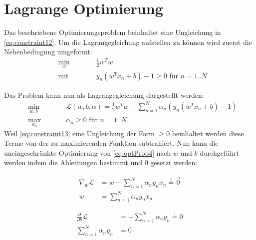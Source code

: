 \documentclass[a4paper,11pt,twoside]{scrreprt}
\newcommand{\Lagr}{\mathcal{L}}
\begin{document}
\section{Lagrange Optimierung} \label{sec:lagrange}

Das beschriebene Optimierungsproblem beinhaltet eine Ungleichung in \autoref{eq:constraint12}. Um die Lagrangegleichung aufstellen zu können wird zuerst die Nebenbedingung umgeformt:
\begin{subequations} \label{min_problem}
	\begin{alignat}{2}
		&\!\min_{w}        &\qquad&  \frac{1}{2} w^{T} w \label{eq:optProb3}\\
		&\text{mit } &      & y_n (w^{T} x_{n} + b)-1 \geq 0 \text{ für } n=1..N \label{eq:constraint13}
	\end{alignat}
\end{subequations}

Das Problem kann nun als Lagrangegleichung dargestellt werden:
\begin{subequations}
	\begin{alignat}{2}
		&\!\min_{w, b}        &\qquad&  \Lagr (w, b, \alpha) = \frac{1}{2} w^{T} w - \sum_{n=1}^{N} \alpha_{n} (y_n (w^{T} x_{n} + b)-1) \label{eq:optProb4}\\
		&\max_{\alpha_{n}} &      & \alpha_{n} \geq 0 \text{ für } n=1..N \label{eq:constraint14}
	\end{alignat}
\end{subequations}
 Weil \autoref{eq:constraint13} eine Ungleichung der Form $\geq 0$ beinhaltet werden diese Terme von der zu maximierenden Funktion subtrahiert. Nun kann die uneingeschränkte Optimierung von \autoref{eq:optProb4} nach $w$ und $b$ durchgeführt werden indem die Ableitungen bestimmt und $0$ gesetzt werden:

\begin{equation} \label{gradient_lagrange_w}
	\begin{aligned}
		\nabla_{w} \Lagr &= w - \sum_{n=1}^{N} \alpha_{n} y_{n} x_{n} \overset{!}{=} \vec{0} \\
		w &= \sum_{n=1}^{N} \alpha_{n} y_{n} x_{n}
	\end{aligned}
\end{equation}

\begin{equation} \label{partial_lagrange_b}
	\begin{aligned}
		\frac{\partial}{\partial b} \Lagr &= - \sum_{n=1}^{N} \alpha_{n} y_{n} \overset{!}{=} 0 \\
		\sum_{n=1}^{N} \alpha_{n} y_{n} &= 0
	\end{aligned}
\end{equation}
\end{document}
